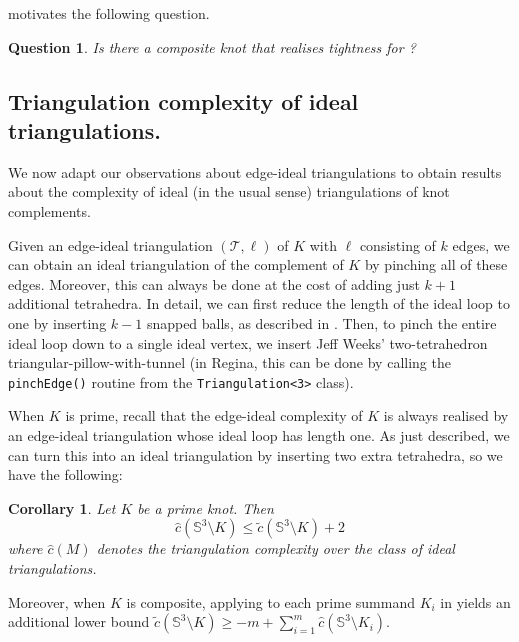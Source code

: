 \documentclass[10pt,a4paper]{amsart}
\newtheorem{corollary}[theorem]{Corollary}
\newcommand{\tri}{\mathcal{T}}
\newtheorem{question}[theorem]{Question}
\begin{document}
 motivates the following question.

\begin{question}
    Is there a composite knot that realises tightness for ?
\end{question}

\subsection{Triangulation complexity of ideal triangulations.}

We now adapt our observations about edge-ideal triangulations to obtain results about the complexity of ideal (in the usual sense) triangulations of knot complements.

Given an edge-ideal triangulation $(\tri,\ell)$ of $K$ with $\ell$ consisting of $k$ edges, we can obtain an ideal triangulation of the complement of $K$ by pinching all of these edges.
Moreover, this can always be done at the cost of adding just $k+1$ additional tetrahedra.
In detail, we can first reduce the length of the ideal loop to one by inserting $k-1$ snapped balls, as described in .
Then, to pinch the entire ideal loop down to a single ideal vertex, we insert Jeff Weeks' two-tetrahedron triangular-pillow-with-tunnel
(in Regina, this can be done by calling the \texttt{pinchEdge()} routine from the \texttt{Triangulation<3>} class).

When $K$ is prime, recall that the edge-ideal complexity of $K$ is always realised by an edge-ideal triangulation whose ideal loop has length one.
As just described, we can turn this into an ideal triangulation by inserting two extra tetrahedra, so we have the following:

\begin{corollary}\label{cor:idealBound}
    Let $K$ be a prime knot. Then
    \[
        \hat{c}(\mathbb{S}^3 \setminus K) \leqslant \tilde{c}(\mathbb{S}^3 \setminus K) + 2
    \]
    where $\hat{c}(M)$ denotes the triangulation complexity over the class of ideal triangulations.
\end{corollary}

Moreover, when $K$ is composite, applying  to each prime summand $K_i$ in  yields an additional lower bound
$\tilde{c}(\mathbb{S}^3 \setminus K) \geqslant -m + \sum_{i=1}^{m} \hat{c}(\mathbb{S}^3 \setminus K_i)$.
\end{document}
